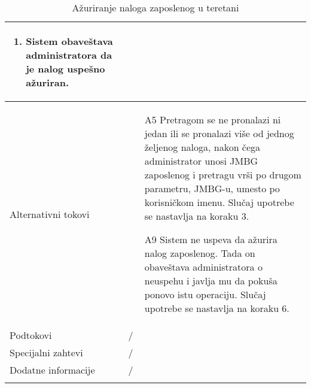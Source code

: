 \documentclass[../main.tex]{subfiles}
\begin{document}
\begin{longtable}{| p{} | p{} |}
\begin{enumerate}
        \item Sistem obaveštava administratora da je nalog uspešno ažuriran.
    \end{enumerate}\\
\hline
    Alternativni tokovi & \begin{itemize}
        \item[A5]  Pretragom se ne pronalazi ni jedan ili se pronalazi više od jednog željenog naloga, nakon čega administrator unosi JMBG zaposlenog i pretragu vrši po drugom parametru, JMBG-u, umesto po korisničkom imenu. Slučaj upotrebe se nastavlja na koraku 3.
        \item[A9]  Sistem ne uspeva da ažurira nalog zaposlenog. Tada on obaveštava administratora o neuspehu i javlja mu da pokuša ponovo istu operaciju. Slučaj upotrebe se nastavlja na koraku 6.

    \end{itemize}\\
\hline
    Podtokovi & /\\
\hline
    Specijalni zahtevi & /\\
\hline
    Dodatne informacije & /\\
\hline
\caption{Ažuriranje naloga zaposlenog u teretani} %
\end{longtable}
\end{document}
